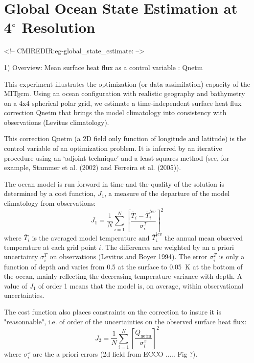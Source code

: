 
\section[Global Ocean State Estimation Example]{Global Ocean State Estimation at 4$^\circ$ Resolution}
\label{www:tutorials}
\label{sect:eg-global_state_estimate}
\begin{rawhtml}
<!-- CMIREDIR:eg-global_state_estimate: -->
\end{rawhtml}

1) Overview: Mean surface heat flux as a  control variable : Qnetm

This experiment illustrates the optimization (or data-assimilation) capacity
of the MITgcm. Using an ocean configuration with realistic geography and bathymetry on a
4x4 spherical polar grid, we estimate a time-independent surface heat flux correction
Qnetm that brings the model climatology into consistency with observations (Levitus
climatology).

This correction Qnetm (a 2D field only function of longitude and latitude) is
the control variable of an optimization problem. It is inferred by an iterative
procedure using an `adjoint technique' and a least-squares method (see, for example, 
Stammer et al. (2002) and Ferreira et al. (2005)).

The ocean model is run forward in time and the quality of the solution is
determined by a cost function, $J_1$, a measure of the departure of the model
climatology from observations:
\begin{equation}
J_1=\frac{1}{N}\sum_{i=1}^N \left[ \frac{\overline{T}_i-\overline{T}_i^{lev}}{\sigma_i^T}\right]^2
\end{equation}
where $\overline{T}_i$ is the averaged model temperature and $\overline{T}_i^{lev}$
the annual mean observed temperature at each grid point $i$. The differences
are weighted by an a priori uncertainty $\sigma_i^T$ on observations (Levitus
and Boyer 1994). The error $\sigma_i^T$ is only a function of depth and varies
from 0.5 at the surface to 0.05~K at the bottom of the ocean, mainly reflecting
the decreasing temperature variance with depth. A value of $J_1$ of order 1 means
that the model is, on average, within observational uncertainties.

The cost function also places constraints on the correction to insure it is
"reasonnable", i.e. of order of the uncertainties on the observed surface heat
flux: 
\begin{equation}
J_2 = \frac{1}{N} \sum_{i=1}^N \left[\frac{Q_\mathrm{netm}}{\sigma^x_i} \right]^2
\end{equation}
where $\sigma^x_i$ are the a priori errors (2d field from ECCO ..... Fig ?).

